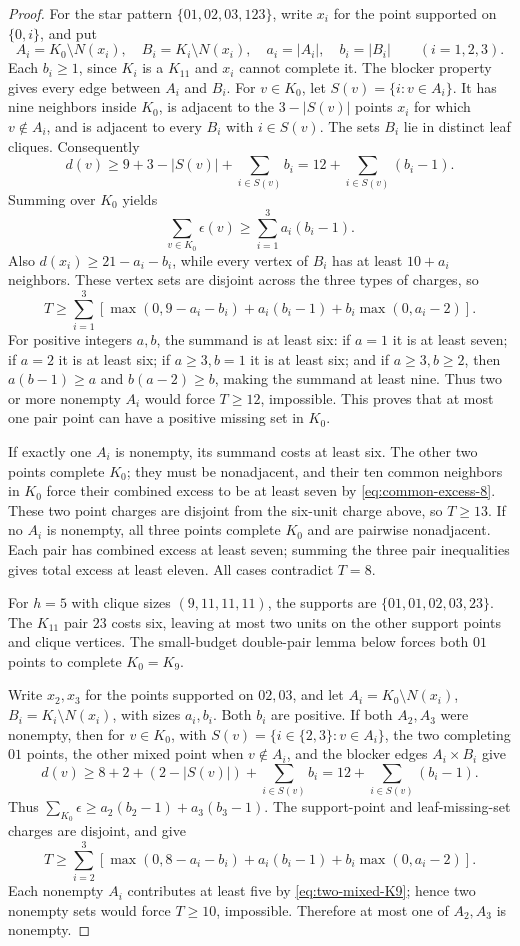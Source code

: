 \begin{proof}
For the star pattern $\{01,02,03,123\}$, write $x_i$ for the point supported on $\{0,i\}$, and put
\[
A_i=K_0\setminus N(x_i),\quad B_i=K_i\setminus N(x_i),\quad
a_i=|A_i|,\quad b_i=|B_i| \qquad (i=1,2,3).
\]
Each $b_i\geq1$, since $K_i$ is a $K_{11}$ and $x_i$ cannot complete it. The blocker property gives every edge between $A_i$ and $B_i$. For $v\in K_0$, let $S(v)=\{i:v\in A_i\}$. It has nine neighbors inside $K_0$, is adjacent to the $3-|S(v)|$ points $x_i$ for which $v\notin A_i$, and is adjacent to every $B_i$ with $i\in S(v)$. The sets $B_i$ lie in distinct leaf cliques. Consequently
\[
d(v)\geq9+3-|S(v)|+\sum_{i\in S(v)}b_i
=12+\sum_{i\in S(v)}(b_i-1).
\]
Summing over $K_0$ yields
\[
\sum_{v\in K_0}\epsilon(v)\geq\sum_{i=1}^3a_i(b_i-1).
\]
Also $d(x_i)\geq21-a_i-b_i$, while every vertex of $B_i$ has at least $10+a_i$ neighbors. These vertex sets are disjoint across the three types of charges, so
\[
T\geq\sum_{i=1}^3
\left[
\max(0,9-a_i-b_i)+a_i(b_i-1)+b_i\max(0,a_i-2)
\right].
\]
For positive integers $a,b$, the summand is at least six: if $a=1$ it is at least seven; if $a=2$ it is at least six; if $a\geq3,b=1$ it is at least six; and if $a\geq3,b\geq2$, then $a(b-1)\geq a$ and $b(a-2)\geq b$, making the summand at least nine. Thus two or more nonempty $A_i$ would force $T\geq12$, impossible. This proves that at most one pair point can have a positive missing set in $K_0$.

If exactly one $A_i$ is nonempty, its summand costs at least six. The other two points complete $K_0$; they must be nonadjacent, and their ten common neighbors in $K_0$ force their combined excess to be at least seven by \eqref{eq:common-excess-8}. These two point charges are disjoint from the six-unit charge above, so $T\geq13$. If no $A_i$ is nonempty, all three points complete $K_0$ and are pairwise nonadjacent. Each pair has combined excess at least seven; summing the three pair inequalities gives total excess at least eleven. All cases contradict $T=8$.

For $h=5$ with clique sizes $(9,11,11,11)$, the supports are $\{01,01,02,03,23\}$. The $K_{11}$ pair $23$ costs six, leaving at most two units on the other support points and clique vertices. The small-budget double-pair lemma below forces both $01$ points to complete $K_0=K_9$.

Write $x_2,x_3$ for the points supported on $02,03$, and let $A_i=K_0\setminus N(x_i)$, $B_i=K_i\setminus N(x_i)$, with sizes $a_i,b_i$. Both $b_i$ are positive. If both $A_2,A_3$ were nonempty, then for $v\in K_0$, with $S(v)=\{i\in\{2,3\}:v\in A_i\}$, the two completing $01$ points, the other mixed point when $v\notin A_i$, and the blocker edges $A_i\times B_i$ give
\[
d(v)\geq8+2+(2-|S(v)|)+\sum_{i\in S(v)}b_i
=12+\sum_{i\in S(v)}(b_i-1).
\]
Thus $\sum_{K_0}\epsilon\geq a_2(b_2-1)+a_3(b_3-1)$. The support-point and leaf-missing-set charges are disjoint, and give
\[
T\geq\sum_{i=2}^3\left[
\max(0,8-a_i-b_i)+a_i(b_i-1)+b_i\max(0,a_i-2)
\right].
\]
Each nonempty $A_i$ contributes at least five by \eqref{eq:two-mixed-K9}; hence two nonempty sets would force $T\geq10$, impossible. Therefore at most one of $A_2,A_3$ is nonempty.


\end{proof}
